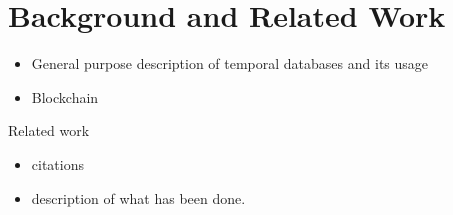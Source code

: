 \chapter{Background and Related Work}


\begin{itemize}
    \item General purpose description of temporal databases and its usage
    \item Blockchain
\end{itemize}

Related work

\begin{itemize}
    \item citations
    \item description of what has been done.
\end{itemize}

